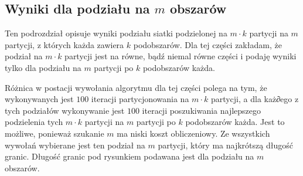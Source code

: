 \subsection{Wyniki dla podziału na $m$ obszarów}

Ten podrozdział opisuje wyniki podziału siatki podzielonej na $m \cdot k$ partycji na $m$ partycji, z których każda
zawiera $k$ podobszarów.
Dla tej części zakładam, że podział na $m \cdot k$ partycji jest na równe, bądź niemal równe części i podaję
wyniki tylko dla podziału na $m$ partycji po $k$ podobszarów każda.

Różnica w postacji wywołania algorytmu dla tej części polega na tym, że wykonywanych jest $100$ iteracji
partycjonowania na $m \cdot k$ partycji, a dla każ∂ego z tych podziałów wykonywanie jest $100$ iteracji poszukiwania
najlepszego podzielenia tych $m \cdot k$ partycji na $m$ partycji po $k$ podobszarów każda.
Jest to możliwe, ponieważ szukanie $m$ ma niski koszt obliczeniowy.
Ze wszystkich wywołań wybierane jest ten podział na $m$ partycji, który ma najkrótszą długość granic.
Długość granic pod rysunkiem podawana jest dla podziału na $m$ obszarów.

\vspace{4mm}

